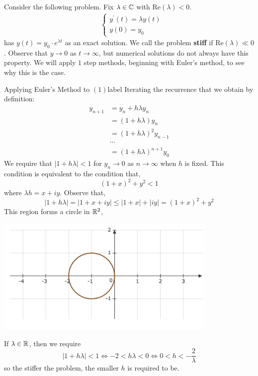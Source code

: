 Consider the following problem. Fix $\lambda \in \mathbb{C}$ with $\text{Re}(\lambda) < 0$. 
\begin{align}
	&\left\{\begin{array}{l}
	y^{\prime}(t)=\lambda y(t) \\
	y(0)=y_0
	\end{array}\right.
\end{align}
has $y(t) = y_0 \cdot e^{\lambda t}$ as an exact solution. We call the problem \textbf{stiff} if $\text{Re}(\lambda) \ll 0$. Observe that $y \rightarrow 0$ as $t \rightarrow \infty$, but numerical solutions do not always have this property. We will apply $1$ step methods, beginning with Euler's method, to see why this is the case.

\NewLine

\begin{ex}{Applying Euler's Method to $(1)$}{label}
	Iterating the recurrence that we obtain by definition:
	\begin{align*}
		y_{n+1}&=y_n+h \lambda y_n \\
		&=(1+h \lambda) y_n \\
		&=(1+h \lambda)^2 y_{n-1} \\
		&\cdots \\
		&= (1+h \lambda)^{n+1} y_0
	\end{align*}
	We require that $|1 + h \lambda| < 1$ for $y_n \rightarrow 0$ as $n \rightarrow \infty$ when $h$ is fixed. This condition is equivalent to the condition that,
	\[(1+x)^2 + y^2 < 1\]
	where $\lambda h = x + iy$. Observe that,
	\[|1 + h \lambda| = |1 + x + iy| \leq |1 + x| + |iy| = (1+x)^2 + y^2\]
	This region forms a circle in $\mathbb{R}^2$,
	\begin{center}
       \includegraphics[width=0.8\textwidth]{figures/fig-27.png}
       \end{center}
       If $\lambda \in \mathbb{R}$, then we require
       \[|1+h\lambda| < 1 \iff -2 < h\lambda < 0 \iff 0 < h < -\frac{2}{\lambda}\]
       so the stiffer the problem, the smaller $h$ is required to be.

\end{ex}

